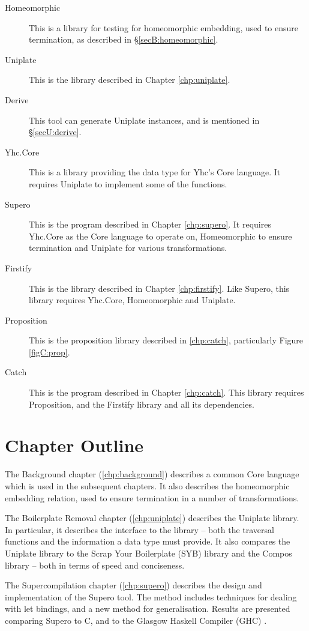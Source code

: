 \begin{description}
\item[Homeomorphic] This is a library for testing for homeomorphic embedding, used to ensure termination, as described in \S\ref{secB:homeomorphic}.
\item[Uniplate] This is the library described in Chapter \ref{chp:uniplate}.
\item[Derive] This tool can generate Uniplate instances, and is mentioned in \S\ref{secU:derive}.
\item[Yhc.Core] This is a library providing the data type for Yhc's Core language. It requires Uniplate to implement some of the functions.
\item[Supero] This is the program described in Chapter \ref{chp:supero}. It requires Yhc.Core as the Core language to operate on, Homeomorphic to ensure termination and Uniplate for various transformations.
\item[Firstify] This is the library described in Chapter \ref{chp:firstify}. Like Supero, this library requires Yhc.Core, Homeomorphic and Uniplate.
\item[Proposition] This is the proposition library described in \ref{chp:catch}, particularly Figure \ref{figC:prop}.
\item[Catch] This is the program described in Chapter \ref{chp:catch}. This library requires Proposition, and the Firstify library and all its dependencies.
\end{description}

\section{Chapter Outline}
\label{secI:chapters}

The Background chapter (\ref{chp:background}) describes a common Core language which is used in the subsequent chapters. It also describes the homeomorphic embedding relation, used to ensure termination in a number of transformations.

The Boilerplate Removal chapter (\ref{chp:uniplate}) describes the Uniplate library. In particular, it describes the interface to the library -- both the traversal functions and the information a data type must provide. It also compares the Uniplate library to the Scrap Your Boilerplate (SYB) library \cite{lammel:syb} and the Compos library \cite{bringert:compos} -- both in terms of speed and conciseness.

The Supercompilation chapter (\ref{chp:supero}) describes the design and implementation of the Supero tool. The method includes techniques for dealing with let bindings, and a new method for generalisation. Results are presented comparing Supero to C, and to the Glasgow Haskell Compiler (GHC) \cite{ghc}.

